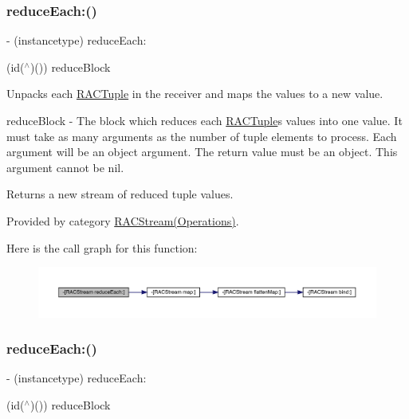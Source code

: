 \subsubsection{\texorpdfstring{reduce\+Each\+:()}{reduceEach:()}\hspace{0.1cm}{\footnotesize\ttfamily [1/3]}}
{\footnotesize\ttfamily -\/ (instancetype) reduce\+Each\+: \begin{DoxyParamCaption}\item[{(id($^\wedge$)())}]{reduce\+Block }\end{DoxyParamCaption}}

Unpacks each \mbox{\hyperlink{interface_r_a_c_tuple}{R\+A\+C\+Tuple}} in the receiver and maps the values to a new value.

reduce\+Block -\/ The block which reduces each \mbox{\hyperlink{interface_r_a_c_tuple}{R\+A\+C\+Tuple}}\textquotesingle{}s values into one value. It must take as many arguments as the number of tuple elements to process. Each argument will be an object argument. The return value must be an object. This argument cannot be nil.

Returns a new stream of reduced tuple values. 

Provided by category \mbox{\hyperlink{category_r_a_c_stream_07_operations_08_aaf04bf295d943b85860ae5cc3d5851ff}{R\+A\+C\+Stream(\+Operations)}}.

Here is the call graph for this function\+:\nopagebreak
\begin{figure}[H]
\begin{center}
\leavevmode
\includegraphics[width=350pt]{interface_r_a_c_stream_aaf04bf295d943b85860ae5cc3d5851ff_cgraph}
\end{center}
\end{figure}
\mbox{\label{interface_r_a_c_stream_aaf04bf295d943b85860ae5cc3d5851ff}} 
\subsubsection{\texorpdfstring{reduce\+Each\+:()}{reduceEach:()}\hspace{0.1cm}{\footnotesize\ttfamily [2/3]}}
{\footnotesize\ttfamily -\/ (instancetype) reduce\+Each\+: \begin{DoxyParamCaption}\item[{(id($^\wedge$)())}]{reduce\+Block }\end{DoxyParamCaption}}

